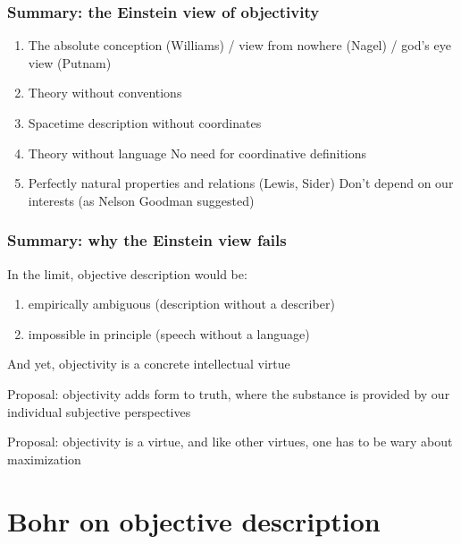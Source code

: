 \documentclass{beamer}
\begin{document}
\begin{frame}
\frametitle{Summary: the Einstein view of objectivity}
  
  \begin{enumerate}
  \item The absolute conception (Williams) / view from nowhere (Nagel)
    / god's eye view (Putnam)
  \item Theory without conventions
  \item Spacetime description without coordinates
  \item Theory without language
    \newline
    No need for coordinative definitions
    \item Perfectly natural properties and relations (Lewis, Sider)
    \newline
    Don't depend on our interests (as Nelson Goodman suggested)  
  \end{enumerate}
\end{frame}

\begin{frame}
\frametitle{Summary: why the Einstein view fails}  

In the limit, objective description would be:
  \begin{enumerate}
  \item empirically ambiguous (description without a describer)
  \item impossible in principle (speech without a language)
  \end{enumerate}

\bigskip And yet, objectivity is a concrete intellectual virtue
  
\medskip Proposal: objectivity adds form to truth, where the substance
is provided by our individual subjective perspectives

\medskip Proposal: objectivity is a virtue, and like other virtues,
one has to be wary about maximization


\end{frame}



\section{Bohr on objective description}

\end{document}
